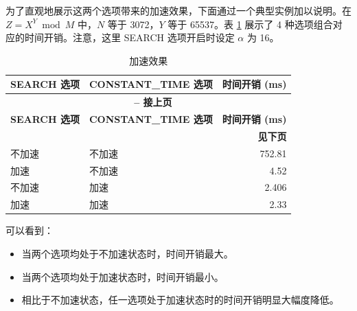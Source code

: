 \documentclass[main\_\_CN.tex]{subfiles}
\begin{document}
为了直观地展示这两个选项带来的加速效果，下面通过一个典型实例加以说明。在 \begin{math}Z = X^{Y} \bmod M\end{math} 中，\begin{math}N\end{math} 等于 3072，\begin{math}Y\end{math} 等于 65537。表 \ref{tab:accelerationeffect} 展示了 4 种选项组合对应的时间开销。注意，这里 SEARCH 选项开启时设定 \begin{math} \alpha \end{math} 为 16。


\begin{longtable}{ | l | l | r | }
    \caption{加速效果}\label{tab:accelerationeffect}
    \\\hline
    \rowcolor{lightgray}
    \textbf{SEARCH 选项} & \textbf{CONSTANT\_TIME 选项} & \textbf{时间开销 (ms)}  \\ \hline
    \endfirsthead
    
    \multicolumn{3}{c}{\bfseries \tablename\ \thetable{} -- 接上页}\\\hline
    
    \rowcolor{lightgray}
    \textbf{SEARCH 选项} & \textbf{CONSTANT\_TIME 选项} & \textbf{时间开销 (ms)}  \\ \hline
    \endhead
    
    \multicolumn{3}{r}{\textbf{见下页}} \\
    \endfoot
    \endlastfoot
    \hline
    
     不加速 & 不加速 & 752.81   \\ \hline    
     加速 & 不加速 & 4.52     \\ \hline
     不加速 & 加速 & 2.406     \\ \hline
     加速 & 加速 & 2.33     \\ \hline
\end{longtable}

可以看到：
\begin{itemize}
    \item 当两个选项均处于不加速状态时，时间开销最大。
    \item 当两个选项均处于加速状态时，时间开销最小。
    \item 相比于不加速状态，任一选项处于加速状态时的时间开销明显大幅度降低。
\end{itemize}
\end{document}
